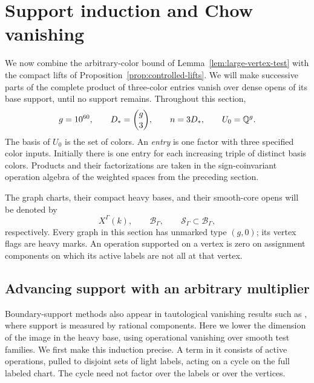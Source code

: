 \section{Support induction and Chow vanishing}
\label{sec:support}

We now combine the arbitrary-color bound of
Lemma~\ref{lem:large-vertex-test} with the compact lifts of
Proposition~\ref{prop:controlled-lifts}.  We will make successive parts
of the complete product of three-color entries vanish over dense opens
of its base support, until no support remains.  Throughout this section,
\[
 g=10^{60},\qquad D_*=\binom g3,\qquad n=3D_*,
 \qquad U_0=\mathbb Q^g.
\]
The basis of \(U_0\) is the set of colors.  An \emph{entry} is one factor
with three specified color inputs.  Initially there is one entry for each
increasing triple of distinct basis colors.  Products and their
factorizations are taken in the sign-coinvariant operation algebra of the
weighted spaces from the preceding section.

The graph charts, their compact heavy bases, and their smooth-core opens
will be denoted by
\[
 X^\Gamma(k),\qquad \mathcal B_\Gamma,\qquad
 \mathcal S_\Gamma\subset\mathcal B_\Gamma,
\]
respectively.  Every graph in this section has unmarked type \((g,0)\);
its vertex flags are heavy marks.  An operation supported on a vertex is
zero on assignment components on which its active labels are not all at
that vertex.

\subsection{Advancing support with an arbitrary multiplier}

Boundary-support methods also appear in tautological vanishing results
such as \cite[Theorem~1.1]{GraberVakil}, where support is measured by
rational components. Here we lower the dimension of the image in the
heavy base, using operational vanishing over smooth test families.
We first make this induction precise.  A term in it consists of
active operations, pulled to disjoint sets of light labels, acting on a
cycle on the full labeled chart.  The cycle need not factor over the
labels or over the vertices.

